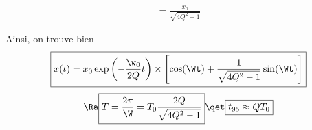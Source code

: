 \documentclass[a4paper, 10pt, final, garamond]{book}
\begin{document}
\begin{enumerate}[label=\sqenumi, leftmargin=10pt]
\begin{isd}[sidebyside align=top]
{\begin{itemize}
\begin{align*}
{						            = \frac{x_0}{\sqrt{4Q^2-1}}}
				            \end{align*}
			      \end{itemize}
			      Ainsi, on trouve bien
			      \[
				      \boxed{
					      x(t) = x_0\exp \left( -\frac{\w_0}{2Q}t \right)\times
					      \left[
						      \cos(\Wt) + \frac{1}{\sqrt{4Q^2 - 1}}\sin(\Wt)
						      \right]
				      }
			      \]
			      \begin{equation*}
				      \Ra
				      \boxed{
					      T =
					      \frac{2\pi}{\W} =
					      T_0 \frac{2Q}{\sqrt{4Q^{2} - 1}}
				      }
				      \qet
				      \boxed{t_{95} \approx QT_0}
			      \end{equation*}
		      }
		      \begin{center}
		      \end{center}
		      \vspace*{-20pt}
	      \end{isd}
	      \vspace*{-20pt}
\end{enumerate}
\end{document}
